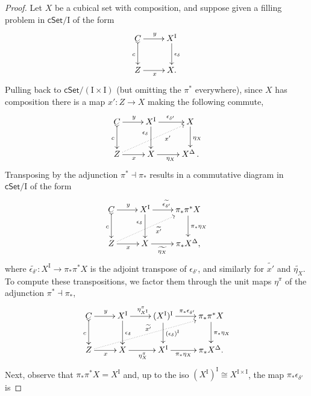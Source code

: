 \documentclass[11pt]{article}
\newcommand{\cSet}{\ensuremath{\mathsf{cSet}}}
\newcommand{\ra}{\ensuremath{\rightarrow}}
\newcommand{\I}{\ensuremath{\mathrm{I}}}
\theoremstyle{remark}
\theoremstyle{definition}
\begin{document}
\begin{proof}
Let $X$ be a cubical set with composition, and suppose given a filling problem in $\cSet/\I$  of the form
\begin{equation}\label{diagram:compimpfill}
\xymatrix{
C \ar@{>->}[d]_{c} \ar[r]^y  & X^\I \ar[d]^{\epsilon_\delta} \\
Z \ar[r]_x & X.
}
\end{equation}
Pulling back to $\cSet/(\I\times\I)$ (but omitting the $\pi^*$ everywhere), since $X$ has composition there is a map $x' : Z \ra X$ making the following commute, 
\begin{equation}\label{diagram:compimpfill2}
\xymatrix{
C \ar@{>->}[d]_{c} \ar[r]^y  & X^\I \ar[d]_>>>>>>>{\epsilon_\delta} \ar[r]^{\epsilon_{\delta'}} 
	&  X \ar[d]^{\eta_X}\\
Z  \ar@{..>}[rru]_>>>>>>>>>{x'} \ar[r]_x & X \ar[r]_{\eta_X} & X^\Delta \,.
}
\end{equation}
%
Transposing by the adjunction $\pi^* \dashv {\pi}_*$ results in a commutative diagram in $\cSet/\I$ of the form
\begin{equation}\label{diagram:compimpfill3}
\xymatrix{
C \ar@{>->}[d]_{c} \ar[r]^y  & X^\I \ar[d]_>>>>>>>{\epsilon_\delta} \ar[r]^{\widetilde{\epsilon_{\delta'}}} 
	&  \pi_*\pi^*X \ar[d]^{\pi_*\eta_X} \\
Z \ar[r]_x \ar@{..>}[rru]_>>>>>>>>>{\widetilde{x'}} & X\ar[r]_-{\widetilde{\eta_X}} & \pi_*X^\Delta,
}
\end{equation}
where $\widetilde{\epsilon_{\delta'}} : X^\I \to \pi_*\pi^*X$ is the adjoint transpose of $\epsilon_{\delta'}$, and similarly for $\widetilde{x'}$ and $\widetilde{\eta_X}$.  To compute these transpositions, we factor them through the unit maps $\eta^\pi$ of the adjunction $\pi^* \dashv {\pi}_*$,
\begin{equation}\label{diagram:compimpfill4}
\xymatrix{
C \ar@{>->}[d]_{c} \ar[r]^y  & X^\I \ar[d]^{\epsilon_\delta} \ar[r]^{\eta^{\pi}_{X^\I}} 
	&  (X^\I)^\I  \ar[d]^{(\epsilon_\delta)^\I} \ar[r]^{\pi_*{\epsilon_{\delta'}}}  &  \pi_*\pi^*X   \ar[d]^{\pi_*\eta_X} \\
Z \ar[r]_x \ar@{..>}[rrru]^{\widetilde{x'}} & X \ar[r]_{\eta^\pi_X} 
	& X^\I \ar[r]_-{\pi_*\eta_X} & \pi_*X^\Delta.
}
\end{equation}
%
Next, observe that $\pi_*\pi^*X = X^\I$ and, up to the iso $(X^\I)^\I \cong X^{\I\times\I}$, the map $\pi_*{\epsilon_{\delta'}}$ is

\end{proof}
\end{document}
